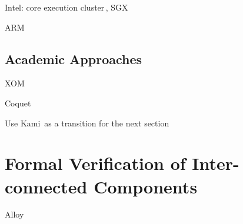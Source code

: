 \begin{compactitem}
\item Intel: core execution cluster\,\cite{kaivola2009formalintel},
  SGX\,\cite{leslie2015sgx}
\item ARM\,\cite{fox2010armv7,reid2016armv8}
\end{compactitem}

\subsection{Academic Approaches} %

\begin{compactitem}
\item XOM\,\cite{lie2003xom}
\item Coquet\,\cite{braibant2011coquet}
\item Use Kami\,\cite{choi2017kami} as a transition for the next section
\end{compactitem}

\section{Formal Verification of Inter-connected Components} %
\label{sec:relatedwork:modular}

\begin{compactitem}
\item Alloy\,\cite{jackson2012alloy}
\end{compactitem}
